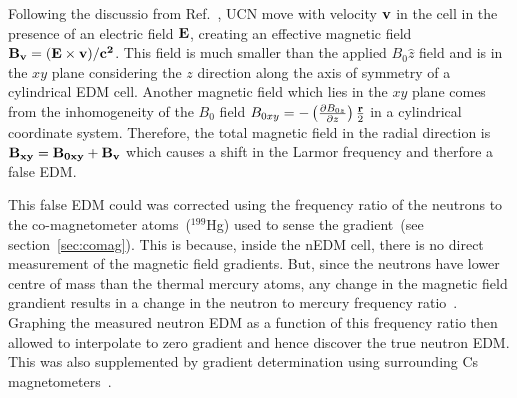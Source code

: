 
Following the discussio from Ref.~\cite{pendlebury2004}, UCN move with
velocity $\bf{v}$ in the cell in the presence of an electric field
$\bf{E}$, creating an effective magnetic field
$\bf{B_v} =(\bf{E} \times \bf{v})/c^2 $. This field is much smaller
than the applied $B_0 \hat{z}$ field and is in the $xy$ plane
considering the $z$ direction along the axis of symmetry of a
cylindrical EDM cell. Another magnetic field which lies in the $xy$
plane comes from the inhomogeneity of the $B_0$ field
$B_{0xy} = - \left( \frac{\partial B_{0z}}{\partial z}
\right)\frac{\bf{r}}{2}$ in a cylindrical coordinate system.  Therefore,
the total magnetic field in the radial direction is
$\bf{B_{xy}} = \bf{B_{0xy}} + \bf{B_v}$ which causes a shift in the
Larmor frequency and therfore a false EDM.






This false EDM could was corrected using the frequency ratio of the
neutrons to the co-magnetometer atoms~($^{199}$Hg) used to sense the
gradient~(see section~\ref{sec:comag}).  This is because, inside the
nEDM cell, there is no direct measurement of the magnetic field
gradients. But, since the neutrons have lower centre of mass than the
thermal mercury atoms, any change in the magnetic field grandient
results in a change in the neutron to mercury frequency
ratio~\cite{Pendlebury2015}.
Graphing the measured neutron EDM as a function of this frequency
ratio then allowed to interpolate to zero gradient and hence discover
the true neutron EDM. This was also supplemented by gradient
determination using surrounding Cs
magnetometers~\cite{afach2015measurement}.


